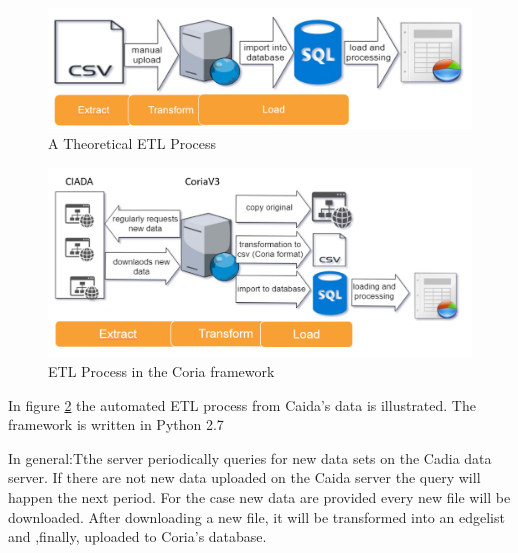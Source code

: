 \documentclass[conference, 11pt]{IEEEtran}
\begin{document}
\begin{figure}[htbp]
\centerline{\includegraphics[scale=0.29]{Graphics/ETL1.PNG}}
\caption{A Theoretical ETL Process}
\label{fig}
\end{figure}



\begin{figure}[htbp]
\centerline{\includegraphics[scale=0.4]{Graphics/ETL2.PNG}}
\caption{ETL Process in the Coria framework}
\label{fig:1}
\end{figure}

In figure \ref{fig:1} the automated ETL process from Caida's data is illustrated. The framework is written in Python 2.7 %

In general:Tthe server periodically queries for new data sets on the Cadia data server. If there are not new data uploaded on the Caida server the query will happen the next period. 
For the case new data are provided every new file will be downloaded. After downloading a new file, it will be transformed into an edgelist and ,finally, uploaded to Coria's database.
\linebreak
\linebreak
\end{document}

